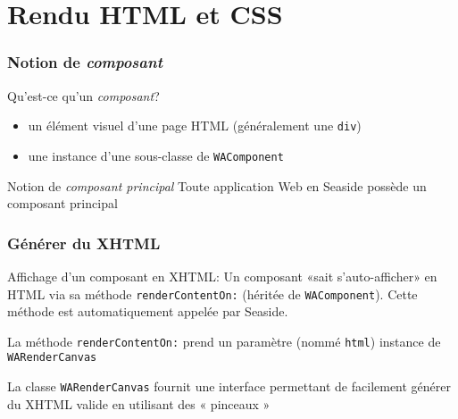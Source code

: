 \documentclass[9pt,compress]{beamer}
\newcommand{\code}[1]{\texttt{\textup{\NoAutoSpaceBeforeFDP #1\AutoSpaceBeforeFDP}}} %
\begin{document}


\frame[plain]{

\vfill
\centering {\huge\color{mystructurecolor}Démo \code{WACounter}}
\vfill

}


\section{Rendu HTML et CSS} %


\begin{frame}\frametitle{Notion de \emph{composant}}
	
	\begin{block}{Qu'est-ce qu'un \emph{composant}?}
		\begin{itemize}
			\item un élément visuel d'une page HTML (généralement une \texttt{div})
			\item une instance d'une sous-classe de \code{WAComponent}
		\end{itemize}
	\end{block}
	
	\begin{block}{Notion de \emph{composant principal}}
		Toute application Web en Seaside possède un composant principal
	\end{block}
	
\end{frame}

\begin{frame}\frametitle{Générer du XHTML}

		\begin{block}{Affichage d'un composant en XHTML:}
	Un composant «sait s'auto-afficher» en HTML via sa méthode \code{renderContentOn:} (héritée de \texttt{WAComponent}).
	Cette méthode est automatiquement appelée par Seaside.
		\end{block}
		
	\begin{block}{La méthode \code{renderContentOn:}}
		prend un paramètre (nommé \texttt{html}) instance de \code{WARenderCanvas}
	\end{block}
	
	\begin{block}{La classe \code{WARenderCanvas}}
		fournit une interface permettant de facilement générer du XHTML \alert{valide} en utilisant des « pinceaux »
	\end{block}
	
\end{frame}
\end{document}
